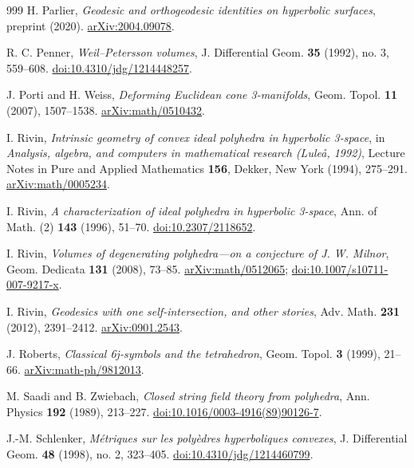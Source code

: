 \documentclass[11pt,a4paper]{article}
\numberwithin{equation}{section}
\theoremstyle{definition}
\theoremstyle{remark}
\begin{document}
\begin{thebibliography}{999}
H. Parlier,
\emph{Geodesic and orthogeodesic identities on hyperbolic surfaces},
preprint (2020).
\href{https://arxiv.org/abs/2004.09078}{arXiv:2004.09078}.

R. C. Penner,
\emph{Weil--Petersson volumes},
J. Differential Geom. \textbf{35} (1992), no. 3, 559--608.
\href{https://doi.org/10.4310/jdg/1214448257}{doi:10.4310/jdg/1214448257}.

J. Porti and H. Weiss,
\emph{Deforming Euclidean cone 3-manifolds},
Geom. Topol. \textbf{11} (2007), 1507--1538.
\href{https://arxiv.org/abs/math/0510432}{arXiv:math/0510432}.

I. Rivin,
\emph{Intrinsic geometry of convex ideal polyhedra in hyperbolic 3-space},
in \emph{Analysis, algebra, and computers in mathematical research
(Lule\aa, 1992)}, Lecture Notes in Pure and Applied Mathematics \textbf{156},
Dekker, New York (1994), 275--291.
\href{https://arxiv.org/abs/math/0005234}{arXiv:math/0005234}.

I. Rivin,
\emph{A characterization of ideal polyhedra in hyperbolic 3-space},
Ann. of Math. (2) \textbf{143} (1996), 51--70.
\href{https://doi.org/10.2307/2118652}{doi:10.2307/2118652}.

I. Rivin,
\emph{Volumes of degenerating polyhedra---on a conjecture of J. W. Milnor},
Geom. Dedicata \textbf{131} (2008), 73--85.
\href{https://arxiv.org/abs/math/0512065}{arXiv:math/0512065};
\href{https://doi.org/10.1007/s10711-007-9217-x}{doi:10.1007/s10711-007-9217-x}.

I. Rivin,
\emph{Geodesics with one self-intersection, and other stories},
Adv. Math. \textbf{231} (2012), 2391--2412.
\href{https://arxiv.org/abs/0901.2543}{arXiv:0901.2543}.

J. Roberts,
\emph{Classical 6j-symbols and the tetrahedron},
Geom. Topol. \textbf{3} (1999), 21--66.
\href{https://arxiv.org/abs/math-ph/9812013}{arXiv:math-ph/9812013}.

M. Saadi and B. Zwiebach,
\emph{Closed string field theory from polyhedra},
Ann. Physics \textbf{192} (1989), 213--227.
\href{https://doi.org/10.1016/0003-4916(89)90126-7}{doi:10.1016/0003-4916(89)90126-7}.

J.-M. Schlenker,
\emph{M\'etriques sur les poly\`edres hyperboliques convexes},
J. Differential Geom. \textbf{48} (1998), no. 2, 323--405.
\href{https://doi.org/10.4310/jdg/1214460799}{doi:10.4310/jdg/1214460799}.


\end{thebibliography}
\end{document}
